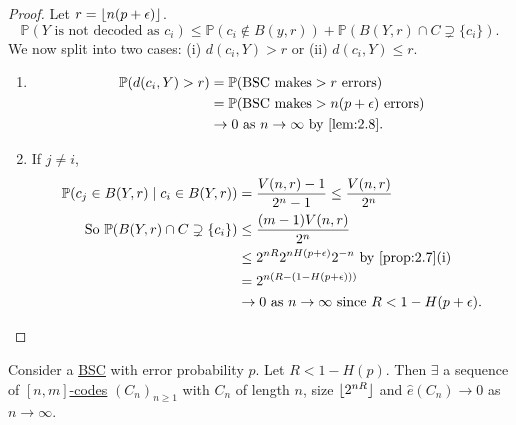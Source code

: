 \documentclass{article}
\DeclarePairedDelimiter{\floor}{\lfloor}{\rfloor}
\newcommand{\Prob}{\mathbb{P}}
\newcommand{\1}[1]{\mathbbm{1}_{#1}}
\begin{document}
\begin{proof}
    Let $r = \floor{n (p+\epsilon)}$.
    \begin{equation*}\Prob(Y \text{ is not decoded as } c_i) \leq \Prob(c_i \notin B(y, r)) + \Prob(B(Y, r) \cap C \supsetneq \{c_i\}).\end{equation*}
    We now split into two cases: (i) $d(c_i, Y) > r$ or (ii) $d(c_i, Y) \leq r$.
    \begin{enumerate}[label=(\roman*)]
        \item \begin{equation*}\begin{aligned}[t]
                \Prob(d(c_i, Y) > r) &= \Prob(\text{BSC makes} >r \text{ errors}) \\
                                     &= \Prob(\text{BSC makes} >n(p+\epsilon) \text{ errors}) \\
                                     &\to 0 \text{ as } n \to \infty \text{ by \cref{lem:2.8}}.
            \end{aligned}\end{equation*}
        \item If $j \neq i$,
            \begin{align*}
                \Prob(c_j \in B(Y, r) \mid c_i \in B(Y, r)) &= \frac{V(n, r) - 1}{2^n - 1} \leq \frac{V(n, r)}{2^n} \\
                \text{So } \Prob(B(Y,r) \cap C \supsetneq \{c_i\}) & \leq \frac{(m-1) V(n, r)}{2^n} \\
                                                                   &\leq 2^{nR} 2^{nH(p+\epsilon)} 2^{-n} \text{ by \cref{prop:2.7}(i)} \\
                                                                   &= 2^{n(R - (1-H(p+\epsilon)))} \\
                                                                   &\to 0 \text{ as } n \to \infty \text{ since } R < 1 - H(p+\epsilon). \qedhere
            \end{align*}
    \end{enumerate}
\end{proof}

\begin{nprop}\label{prop:2.17}
    Consider a \hyperlink{def:bsc}{BSC} with error probability $p$.
    Let $R < 1 - H(p)$. Then $\exists$ a sequence of \hyperlink{def:binaryCode}{$[n, m]$-codes} $(C_n)_{n \geq 1}$ with $C_n$ of length $n$, size $\floor{2^{nR}}$ and $\hat{e}(C_n) \to 0$ as $n \to \infty$.
\end{nprop}
\end{document}
